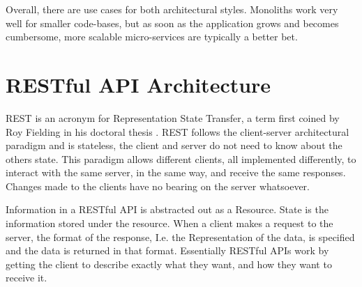Overall, there are use cases for both architectural styles. Monoliths work very well for smaller code-bases, but as soon as the application grows and becomes cumbersome, more scalable micro-services are typically a better bet.

\section{RESTful API Architecture}

REST is an acronym for Representation State Transfer, a term first coined by Roy Fielding in his doctoral thesis \cite{fielding}. REST follows the client-server architectural paradigm and is stateless, the client and server do not need to know about the others state. This paradigm allows different clients, all implemented differently, to interact with the same server, in the same way, and receive the same responses. Changes made to the clients have no bearing on the server whatsoever.

Information in a RESTful API is abstracted out as a Resource. State is the information stored under the resource. When a client makes a request to the server, the format of the response, I.e. the Representation of the data, is specified and the data is returned in that format. Essentially RESTful APIs work by getting the client to describe exactly what they want, and how they want to receive it.
